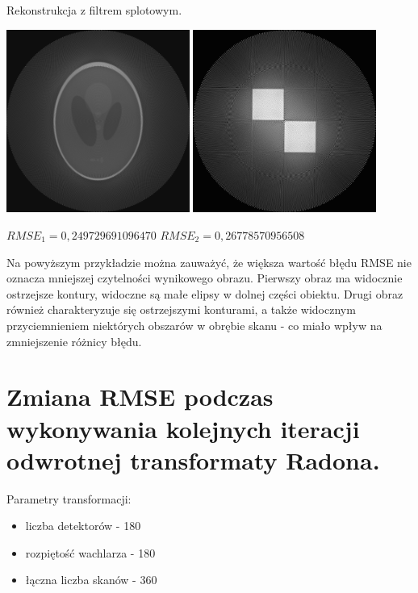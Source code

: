 \documentclass[a4paper, 11pt]{article}
\begin{document}
\begin{center}
	Rekonstrukcja z filtrem splotowym.


	\includegraphics[width=0.45\textwidth]{reconstructed_filtered1.png}
	\includegraphics[width=0.45\textwidth]{reconstructed_filtered2.png}

	$RMSE_1 = 0,249729691096470$ \hspace{1.5cm} $RMSE_2=0,26778570956508$
\end{center}


Na powyższym przykładzie można zauważyć, że większa wartość błędu RMSE nie oznacza mniejszej czytelności wynikowego obrazu. Pierwszy obraz ma widocznie ostrzejsze kontury, widoczne są małe elipsy w dolnej części obiektu. Drugi obraz również charakteryzuje się ostrzejszymi konturami, a także widocznym przyciemnieniem niektórych obszarów w obrębie skanu - co miało wpływ na zmniejszenie różnicy błędu.
\newpage

\section{Zmiana RMSE podczas wykonywania kolejnych iteracji odwrotnej transformaty Radona.}


Parametry transformacji:
\begin{itemize}
	\item liczba detektorów - 180
	\item rozpiętość wachlarza - 180\degree
	\item łączna liczba skanów - 360
\end{itemize}
\end{document}
